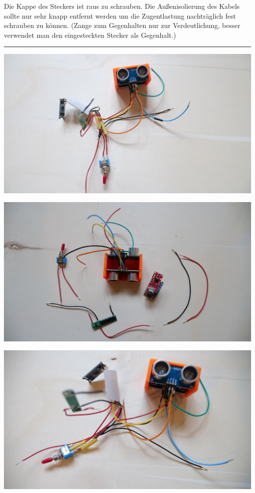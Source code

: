 \documentclass[
]{article}
\begin{document}
{}

{Die Kappe des Steckers ist raus zu schrauben. Die Außenisolierung des
Kabels sollte nur sehr knapp entfernt werden um die Zugentlastung
nachträglich fest schrauben zu können. (Zange zum Gegenhalten nur zur
Verdeutlichung, besser verwendet man den eingesteckten Stecker als
Gegenhalt.)}

\begin{center}\rule{0.5\linewidth}{0.5pt}\end{center}

{}

{\includegraphics{images/image14.jpg}}

{\includegraphics{images/image20.jpg}}

{\includegraphics{images/image8.jpg}}
\end{document}
